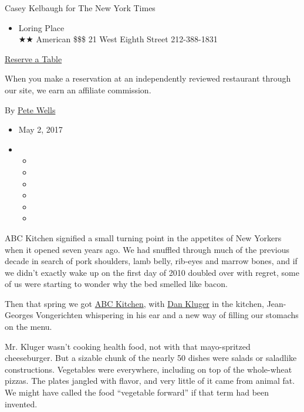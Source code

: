Casey Kelbaugh for The New York Times

\begin{itemize}
\tightlist
\item
  Loring Place\\
  ★★ American \$\$\$ 21 West Eighth Street 212-388-1831
\end{itemize}

\href{https://resy.com/cities/ny/loring-place?utm_source=nyt\&utm_medium=restoprofile\&utm_campaign=affiliates\&aff_id=c1fe784}{Reserve
a Table}

When you make a reservation at an independently reviewed restaurant
through our site, we earn an affiliate commission.

By \href{http://www.nytimes3xbfgragh.onion/by/pete-wells}{Pete Wells}

\begin{itemize}
\item
  May 2, 2017
\item
  \begin{itemize}
  \item
  \item
  \item
  \item
  \item
  \item
  \end{itemize}
\end{itemize}

ABC Kitchen signified a small turning point in the appetites of New
Yorkers when it opened seven years ago. We had snuffled through much of
the previous decade in search of pork shoulders, lamb belly, rib-eyes
and marrow bones, and if we didn't exactly wake up on the first day of
2010 doubled over with regret, some of us were starting to wonder why
the bed smelled like bacon.

Then that spring we got
\href{http://www.nytimes3xbfgragh.onion/2010/06/02/dining/reviews/02rest.html}{ABC
Kitchen}, with
\href{https://www.nytimes3xbfgragh.onion/2016/09/07/dining/chef-dan-kluger-restaurant-abc-kitchen.html}{Dan
Kluger} in the kitchen, Jean-Georges Vongerichten whispering in his ear
and a new way of filling our stomachs on the menu.

Mr. Kluger wasn't cooking health food, not with that mayo-spritzed
cheeseburger. But a sizable chunk of the nearly 50 dishes were salads or
saladlike constructions. Vegetables were everywhere, including on top of
the whole-wheat pizzas. The plates jangled with flavor, and very little
of it came from animal fat. We might have called the food ``vegetable
forward'' if that term had been invented.

